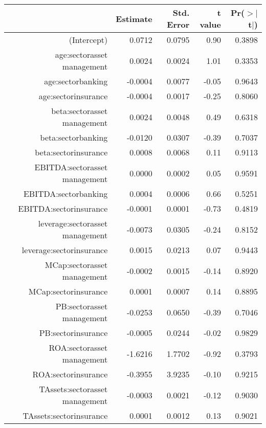 \begin{table}[ht]
\centering
\begin{tabular}{rrrrr}
  \hline
 & Estimate & Std. Error & t value & Pr($>$$|$t$|$) \\ 
  \hline
(Intercept) & 0.0712 & 0.0795 & 0.90 & 0.3898 \\ 
  age:sectorasset management & 0.0024 & 0.0024 & 1.01 & 0.3353 \\ 
  age:sectorbanking & -0.0004 & 0.0077 & -0.05 & 0.9643 \\ 
  age:sectorinsurance & -0.0004 & 0.0017 & -0.25 & 0.8060 \\ 
  beta:sectorasset management & 0.0024 & 0.0048 & 0.49 & 0.6318 \\ 
  beta:sectorbanking & -0.0120 & 0.0307 & -0.39 & 0.7037 \\ 
  beta:sectorinsurance & 0.0008 & 0.0068 & 0.11 & 0.9113 \\ 
  EBITDA:sectorasset management & 0.0000 & 0.0002 & 0.05 & 0.9591 \\ 
  EBITDA:sectorbanking & 0.0004 & 0.0006 & 0.66 & 0.5251 \\ 
  EBITDA:sectorinsurance & -0.0001 & 0.0001 & -0.73 & 0.4819 \\ 
  leverage:sectorasset management & -0.0073 & 0.0305 & -0.24 & 0.8152 \\ 
  leverage:sectorinsurance & 0.0015 & 0.0213 & 0.07 & 0.9443 \\ 
  MCap:sectorasset management & -0.0002 & 0.0015 & -0.14 & 0.8920 \\ 
  MCap:sectorinsurance & 0.0001 & 0.0007 & 0.14 & 0.8895 \\ 
  PB:sectorasset management & -0.0253 & 0.0650 & -0.39 & 0.7046 \\ 
  PB:sectorinsurance & -0.0005 & 0.0244 & -0.02 & 0.9829 \\ 
  ROA:sectorasset management & -1.6216 & 1.7702 & -0.92 & 0.3793 \\ 
  ROA:sectorinsurance & -0.3955 & 3.9235 & -0.10 & 0.9215 \\ 
  TAssets:sectorasset management & -0.0003 & 0.0021 & -0.12 & 0.9030 \\ 
  TAssets:sectorinsurance & 0.0001 & 0.0012 & 0.13 & 0.9021 \\ 
   \hline
\end{tabular}
\end{table}
